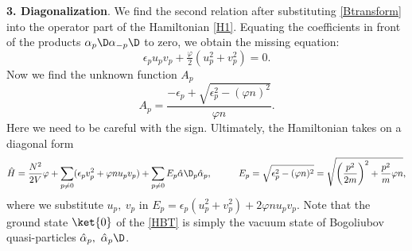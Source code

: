 \textbf{3. Diagonalization}. We find the second relation after substituting \eqref{Btransform} into the operator part of the Hamiltonian \eqref{H1}. Equating the coefficients in front of the products $\alpha_p\D \alpha_{-p}\D$ to zero, we obtain the missing equation:
\begin{equation*}
	\epsilon_p u_p v_p + \tfrac{\varphi}{2} (u_p^2 + v_p^2) = 0.
\end{equation*}
Now we find the unknown function $A_p$
\begin{equation}
	A_p = \frac{-\epsilon_p + \sqrt{\epsilon_p^2-(\varphi n)^2}}{\varphi n}.
	\label{Ap}
\end{equation}
Here we need to be careful with the sign. Ultimately, the Hamiltonian takes on a diagonal form
\begin{equation}
	\hat{H} = \frac{N^2}{2V}\varphi + \sum_{p \neq 0} (\epsilon_p v_p^2 + \varphi n u_p v_p) + \sum_{p \neq 0} E_p \hat{\alpha}\D_p \hat{\alpha}_p,
	\hspace{10 mm} 
	E_p = \sqrt{\epsilon_p^2 - (\varphi n)^2} = \sqrt{\left(\frac{p^2}{2m}\right)^2 + \frac{p^2}{m} \varphi n},
	\label{HBT}
\end{equation}
where we substitute $u_p,\ v_p$ in  $E_p = \epsilon_p (u_p^2 + v_p^2) + 2 \varphi n u_p v_p$. Note that the ground state $\ket{0}$ of the \eqref{HBT} is simply the vacuum state of Bogoliubov quasi-particles $\hat{\alpha}_p,\ \hat{\alpha}_p\D$.


